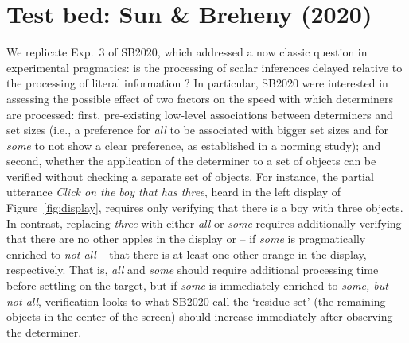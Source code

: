 \documentclass[10pt,letterpaper]{article}
\newcommand{\figref}[1]{Figure~\ref{#1}}
\newcommand{\expref}[1]{Exp.~#1}
\begin{document}
\section{Test bed: Sun \& Breheny (2020)}

We replicate \expref{3} of SB2020, which addressed a now classic question in experimental pragmatics: is the processing of scalar inferences delayed relative to the processing of literal information \cite{bott2004, Breheny2006, huang2009, grodner2010, DegenTanenhaus2015, DegenT2016, Tomlinson2013}? In particular, SB2020 were interested in assessing the possible effect of two factors on the speed with which determiners are processed: first, pre-existing low-level associations between determiners and set sizes (i.e., a preference for \emph{all} to be associated with bigger set sizes and for \emph{some} to not show a clear preference, as established in a norming study); and second, whether the application of the determiner to a set of objects can be verified without checking a separate set of objects. For instance, the partial utterance \emph{Click on the boy that has three}, heard in the left display of \figref{fig:display}, requires only verifying that there is a boy with three objects. In contrast, replacing \emph{three} with either \emph{all} or \emph{some} requires additionally verifying that there are no other apples in the display or -- if \emph{some} is pragmatically enriched to \emph{not all} --  that there is at least one other orange in the display, respectively. That is, \emph{all} and \emph{some} should require additional processing time before settling on the target, but if \emph{some} is immediately enriched to \emph{some, but not all}, verification looks to what SB2020 call the `residue set' (the remaining objects in the center of the screen) should increase immediately after observing the determiner. 
\end{document}
